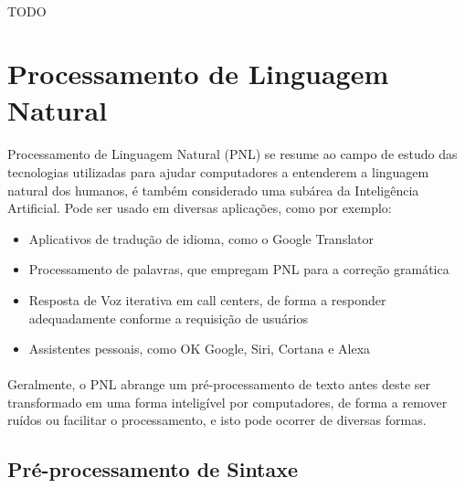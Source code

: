 \documentclass[grad,numbers]{coppe}
\begin{document}
  		\paragraph{}TODO
	  	
  \section{Processamento de Linguagem Natural}
  	\paragraph{}Processamento de Linguagem Natural (PNL) se resume ao campo de estudo das tecnologias utilizadas para ajudar computadores a entenderem a linguagem natural dos humanos, é também considerado uma subárea da Inteligência Artificial. Pode ser usado em diversas aplicações\cite{simple-nlp}, como por exemplo:
  	\begin{itemize}
  		\item Aplicativos de tradução de idioma, como o Google Translator
  		\item Processamento de palavras, que empregam PNL para a correção gramática
  		\item Resposta de Voz iterativa em call centers, de forma a responder adequadamente conforme a requisição de usuários
  		\item Assistentes pessoais, como OK Google, Siri, Cortana e Alexa
  	\end{itemize}
	  \paragraph{}Geralmente, o PNL abrange um pré-processamento de texto antes deste ser transformado em uma forma inteligível por computadores, de forma a remover ruídos ou facilitar o processamento, e isto pode ocorrer de diversas formas.
	  \subsection{Pré-processamento de Sintaxe}
\end{document}
